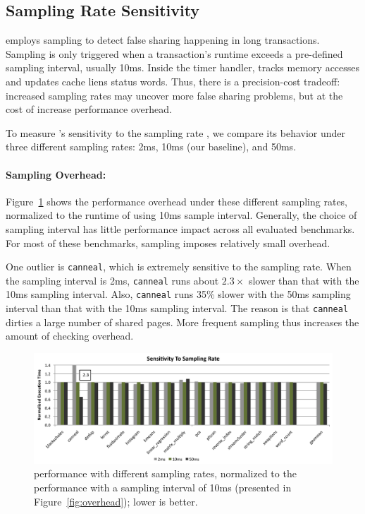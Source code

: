 \subsection{\SheriffDetect{} Sampling Rate Sensitivity}
\label{sec:results-sampling-overhead}

\SheriffDetect{} employs sampling to detect false sharing happening in long transactions. Sampling is only triggered when a transaction's runtime exceeds a pre-defined sampling interval, usually 10ms. Inside the timer handler, \SheriffDetect{} tracks memory accesses and updates cache liens status words. Thus, there is a precision-cost tradeoff: increased sampling rates may uncover more false sharing problems, but at the cost of increase performance overhead. 

To measure \sheriffdetect{}'s sensitivity to the sampling rate
, we compare its behavior under three different sampling
rates: 2ms, 10ms (our baseline), and 50ms.

\paragraph{Sampling Overhead:} Figure~\ref{fig:sensitivity} shows the performance overhead under these different sampling rates, normalized to the runtime of using 10ms sample interval. Generally, the choice of sampling interval has little performance impact across all evaluated benchmarks.  For most of these benchmarks, sampling imposes relatively
small overhead.

One outlier is \texttt{canneal}, which is extremely sensitive to the sampling rate.  When the sampling interval is 2ms, \texttt{canneal} runs about $2.3\times$ slower than that with  the 10ms sampling interval. Also, \texttt{canneal} runs 35\% slower with the 50ms sampling interval than that with the 10ms
sampling interval. The reason is that \texttt{canneal} dirties a large number of shared pages. More frequent sampling thus increases the amount of checking overhead.


\begin{figure}[!t]
\centering
\includegraphics[width=5in]{sheriff/figure/sensitivity}
\caption{\sheriffdetect{} performance with different sampling rates,
  normalized to the performance with a sampling interval of 10ms
(presented in Figure~\ref{fig:overhead}); lower is better.
\label{fig:sensitivity}}
\end{figure}

